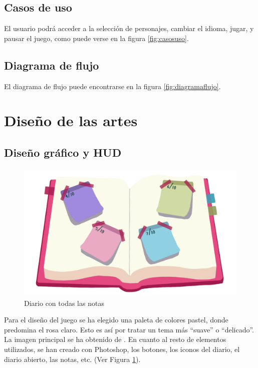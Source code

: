 \documentclass[12pt, a4paper,twoside,titlepage]{book}
\begin{document}
\subsection{Casos de uso}


El usuario podrá acceder a la selección de personajes, cambiar el idioma, jugar, y pausar el juego, como puede verse en la figura \ref{fig:casosuso}. 



\subsection{Diagrama de flujo}

El diagrama de flujo puede encontrarse en la figura \ref{fig:diagramaflujo}.





\section{Diseño de las artes}
\subsection{Diseño gráfico y HUD}

\begin{figure}
	\centering
	\includegraphics[width=.8\linewidth]{TGF/Artes/diarioNotas.png}
	\caption{Diario con todas las notas}
	\label{fig:diarioNotas}
\end{figure}

Para el diseño del juego se ha elegido una paleta de colores pastel, donde predomina el rosa claro. Esto es así por tratar un tema más ``suave'' o ``delicado''. La imagen principal se ha obtenido de \cite{imgInicio}. En cuanto al resto de elementos utilizados, se han creado con Photoshop, los botones, los iconos del diario, el diario abierto, las notas, etc. (Ver Figura \ref{fig:diarioNotas}). 
\end{document}
